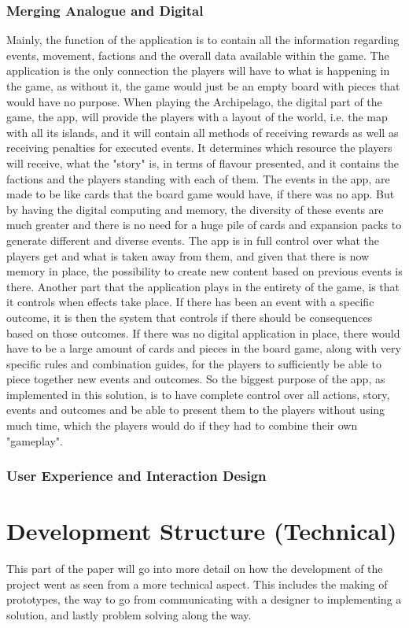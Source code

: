 \subsubsection{Merging Analogue and Digital}
Mainly, the function of the application is to contain all the information regarding events, movement, factions and the overall data available within the game. The application is the only connection the players will have to what is happening in the game, as without it, the game would just be an empty board with pieces that would have no purpose. 
When playing the Archipelago, the digital part of the game, the app, will provide the players with a layout of the world, i.e. the map with all its islands, and it will contain all methods of receiving rewards as well as receiving penalties for executed events. It determines which resource the players will receive, what the "story" is, in terms of flavour presented, and it contains the factions and the players standing with each of them.
The events in the app, are made to be like cards that the board game would have, if there was no app. But by having the digital computing and memory, the diversity of these events are much greater and there is no need for a huge pile of cards and expansion packs to generate different and diverse events. The app is in full control over what the players get and what is taken away from them, and given that there is now memory in place, the possibility to create new content based on previous events is there. Another part that the application plays in the entirety of the game, is that it controls when effects take place. If there has been an event with a specific outcome, it is then the system that controls if there should be consequences based on those outcomes. If there was no digital application in place, there would have to be a large amount of cards and pieces in the board game, along with very specific rules and combination guides, for the players to sufficiently be able to piece together new events and outcomes. So the biggest purpose of the app, as implemented in this solution, is to have complete control over all actions, story, events and outcomes and be able to present them to the players without using much time, which the players would do if they had to combine their own "gameplay".
\subsubsection{User Experience and Interaction Design}


\section{Development Structure (Technical)}
This part of the paper will go into more detail on how the development of the project went as seen from a more technical aspect. This includes the making of prototypes, the way to go from communicating with a designer to implementing a solution, and lastly problem solving along the way.

